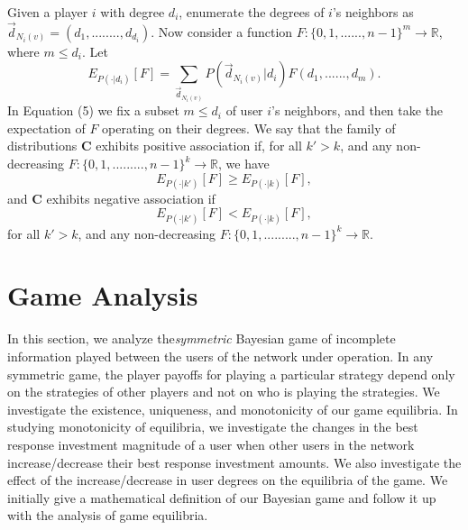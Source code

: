 \documentclass[letterpaper,12pt,onecolumn, nodraft]{IEEEtran}
\begin{document}
Given a player $i$ with degree $d_{i}$, enumerate the degrees of $i$'s neighbors as $\overrightarrow d_{N_{i}(v)} = (d_{1},........,d_{d_{i}})$. Now consider a function $F: \{0,1,......, n- 1\}^{m} \rightarrow \mathbb{R}$, where $m \le d_{i}$. Let 
\begin{equation}
E_{P(\cdot|d_{i})}[F] = \sum_{\overrightarrow d_{N_{i}(v)}} P(\overrightarrow d_{N_{i}(v)}|d_{i})F(d_{1},......,d_{m}).
\end{equation}
In Equation (5) we fix a subset $m\le d_{i}$ of user $i$'s neighbors, and then take the expectation of $F$ operating on their degrees. We say that the family of distributions \textbf{C} exhibits positive association if, for all $k' > k$, and any non-decreasing $F:\{0,1,.........,n -1\}^{k} \rightarrow \mathbb{R}$, we have 
\begin{equation}
E_{P(\cdot|k')}[F] \ge E_{P(\cdot|k)}[F],
\end{equation}
and \textbf{C} exhibits negative association if  
\begin{equation}
E_{P(\cdot|k')}[F] < E_{P(\cdot|k)}[F],
\end{equation}
for  all $k' > k$, and any non-decreasing $F:\{0,1,.........,n -1\}^{k} \rightarrow \mathbb{R}$.
\section{Game Analysis}
In this section, we analyze the\emph{symmetric} Bayesian game of incomplete information played between the users of the network under operation. In any symmetric game, the player payoffs for playing a particular strategy depend only on the strategies of other players and not on who is playing the strategies. We investigate the existence, uniqueness, and monotonicity of our game equilibria. In studying monotonicity of equilibria, we investigate the changes in the best response investment magnitude of a user when other users in the network increase/decrease their best response investment amounts. We also investigate the effect of the increase/decrease in user degrees on the equilibria of the game. We initially give a mathematical definition of our Bayesian game and follow it up with the analysis of game equilibria. 
\end{document}
